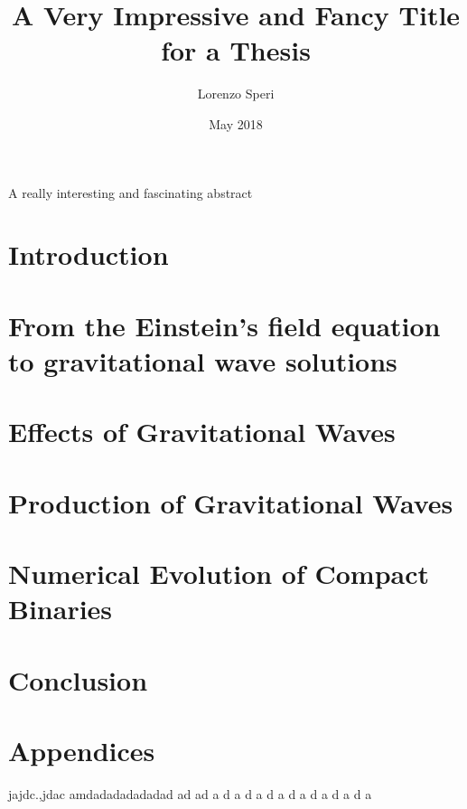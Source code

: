 \documentclass[twoside,english, a4paper, 12pt]{shared/uiofysmaster}
\author{Lorenzo Speri}
\title{\bf{A Very Impressive and Fancy Title for a Thesis}}
\date{May 2018}
\begin{document}

\maketitle
\clearpage

\tableofcontents
\clearpage

\begin{abstract1}
A really interesting and fascinating abstract
\end{abstract1}

\clearpage
\section{Introduction}


\clearpage
\section{From the Einstein's field equation\\ to gravitational wave solutions}


\clearpage
\section{Effects of Gravitational Waves}


\clearpage
\section{Production of Gravitational Waves}


\clearpage
\section{Numerical Evolution of Compact Binaries}


\clearpage
\section{Conclusion}


\clearpage
\section{Appendices}

jajdc.,jdac amdadadadadadad ad ad a  d a d a d a d a  d a d a d a





\end{document}

